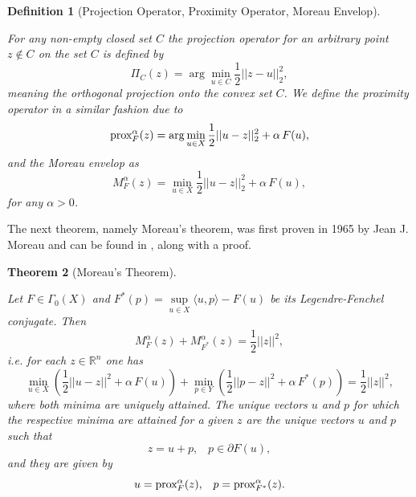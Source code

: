 \documentclass{scrreprt}
\newtheorem{theorem}{Theorem}[chapter]
\newtheorem{definition}[theorem]{Definition}
\begin{document}
        \begin{definition}[Projection Operator, Proximity Operator, Moreau Envelop] %
        \label{def:projection_operator}

            For any non-empty closed set $C$ the projection operator for an arbitrary point $z \notin C$ on the set $C$ is defined by
                \begin{equation}
                    \Pi_{C}(z) = \arg \min_{u \in C} \frac{1}{2} ||z - u||_{2}^{2},
                \end{equation}
            meaning the orthogonal projection onto the convex set $C$. We define the proximity operator in a similar fashion due to
                \begin{equation}
                    \textnormal{prox}^{\alpha}_{F}(z) = \arg \min_{u \in X} \frac{1}{2} ||u - z||_{2}^{2} + \alpha \, F(u),
                    \label{eq:proximity_operator}
                \end{equation}
            and the Moreau envelop as
                $$
                    M^{\alpha}_{F}(z) = \min_{u \in X} \frac{1}{2} ||u - z||_{2}^{2} + \alpha \, F(u),
                $$
            for any $\alpha > 0$.
        \end{definition}

        The next theorem, namely Moreau's theorem, was first proven in 1965 by Jean J. Moreau and can be found in \cite{Rockafellar}, along with a proof.

        \begin{theorem}[Moreau's Theorem] %
        \label{the:moreau_identity}

            Let $F \in \Gamma_{0}(X)$ and $F^{\ast}(p) = \sup\limits_{u \in X} \langle u, p \rangle - F(u)$ be its Legendre-Fenchel conjugate. Then
                $$
                    M^{\alpha}_{F}(z) + M^{\alpha}_{F^{\ast}}(z) = \frac{1}{2}||z||^{2},
                $$
            i.e. for each $z \in \mathbb{R}^{n}$ one has
                $$
                    \min_{u \in X} \left( \frac{1}{2} ||u - z||^{2} +  \alpha \, F(u) \right) + \min_{p \in Y} \left( \frac{1}{2} ||p - z||^{2} +  \alpha \, F^{\ast}(p) \right) = \frac{1}{2}||z||^{2},
                $$
            where both minima are uniquely attained. The unique vectors $u$ and $p$ for which the respective minima are attained for a given $z$ are the unique vectors $u$ and $p$ such that
                \begin{equation}
                    z = u + p, \,\,\,\,\, p \in \partial F(u),
                    \label{eq:equivalence_of_moreau_property}
                \end{equation}
            and they are given by
                \begin{equation}
                    u = \textnormal{prox}^{\alpha}_{F}(z), \,\,\,\,\, p = \textnormal{prox}^{\alpha}_{F^{\ast}}(z).
                    \label{eq:prox_z}
                \end{equation}
        \end{theorem}
\end{document}
